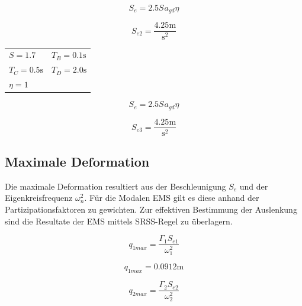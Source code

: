 \documentclass[
  letterpaper,
  DIV=11]{scrreprt}
\begin{document}
\begin{equation}S_{e} = 2.5 S_{} a_{gd} \eta\end{equation}

\begin{equation}S_{e 2} = \frac{4.25 \text{m}}{\text{s}^{2}}\end{equation}

\begin{longtable}[]{@{}
  >{\raggedright\arraybackslash}p{}
  >{\raggedright\arraybackslash}p{}@{}}
\toprule\noalign{}
\endhead
\bottomrule\noalign{}
\endlastfoot
\(S = 1.7\) & \(T_{B} = 0.1 \text{s}\) \\
\(T_{C} = 0.5 \text{s}\) & \(T_{D} = 2.0 \text{s}\) \\
\(\eta = 1\) & \\
\end{longtable}

\begin{equation}S_{e} = 2.5 S_{} a_{gd} \eta\end{equation}

\begin{equation}S_{e 3} = \frac{4.25 \text{m}}{\text{s}^{2}}\end{equation}

\hypertarget{maximale-deformation}{%
\subsection{Maximale Deformation}\label{maximale-deformation}}

Die maximale Deformation resultiert aus der Beschleunigung \(S_e\) und
der Eigenkreisfrequenz \(\omega_n^2\). Für die Modalen EMS gilt es diese
anhand der Partizipationsfaktoren zu gewichten. Zur effektiven
Bestimmung der Auslenkung sind die Resultate der EMS mittels SRSS-Regel
zu überlagern.

\begin{equation}q_{1 max} = \frac{\Gamma_{1} S_{e 1}}{\omega_{1}^{2}}\end{equation}

\begin{equation}q_{1 max} = 0.0912 \text{m}\end{equation}

\begin{equation}q_{2 max} = \frac{\Gamma_{2} S_{e 2}}{\omega_{2}^{2}}\end{equation}
\end{document}
